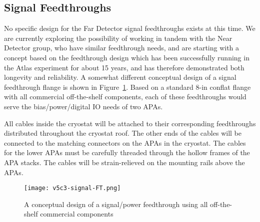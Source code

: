 %
\subsection{Signal Feedthroughs }
\label{subsec:ce_feedthroughs}

No specific design for the Far Detector signal feedthroughs exists at this time.
We are currently exploring the possibility of working in tandem with the Near Detector group, who have
similar feedthrough needs, and are starting with a concept based on the feedthrough design which has been successfully
running in the Atlas experiment for about 15 years, and has therefore demonstrated both longevity and reliability.
A somewhat different conceptual design of a signal feedthrough flange is shown in Figure~\ref{fig:ce_feedthrough}.
Based on a standard 8-in conflat flange with all commercial off-the-shelf components,
each of these feedthroughs would serve the bias/power/digital IO needs of two APAs.  

All cables inside the cryostat will be attached to their corresponding feedthroughs distributed throughout the cryostat roof.
The other ends of the cables will be connected to the matching connectors on the APAs in the cryostat.
The cables for the lower APAs must be carefully threaded through the hollow frames of the APA stacks.
The cables will be strain-relieved on the  mounting rails above the APAs. 


\begin{figure}[htbp]
\centering
\texttt{[image: v5c3-signal-FT.png]}
\caption[Conceptual design of signal/power feedthrough]{A conceptual design of a signal/power feedthrough using all off-the-shelf commercial components}
\label{fig:ce_feedthrough}
\end{figure}

